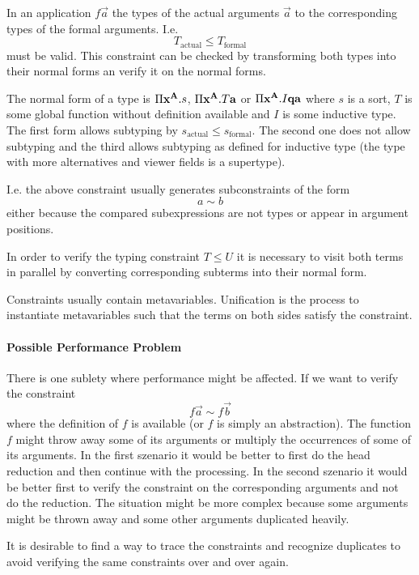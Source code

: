 In an application $f \vec a$ the types of the actual arguments $\vec a$ to the
corresponding types of the formal arguments. I.e.
$$
    T_\text{actual} \le T_\text{formal}
$$
must be valid. This constraint can be checked by transforming both types into
their normal forms an verify it on the normal forms.

The normal form of a type is $\Pi {{\mathbf x}^{{\mathbf A}}}. s$, $\Pi {{\mathbf x}^{{\mathbf A}}}. T {\mathbf a}$ or $\Pi {{\mathbf x}^{{\mathbf A}}} . I {\mathbf q} {\mathbf a}$ where $s$ is a sort, $T$ is some global
function without definition available and $I$ is some inductive type. The first
form allows subtyping by $s_\text{actual} \le s_\text{formal}$. The second one
does not allow subtyping and the third allows subtyping as defined for inductive
type (the type with more alternatives and viewer fields is a supertype).

I.e. the above constraint usually generates subconstraints of the form
$$
    a \sim b
$$
either because the compared subexpressions are not types or appear in argument
positions.

In order to verify the typing constraint $T \le U$ it is necessary to visit both
terms in parallel by converting corresponding subterms into their normal form.

Constraints usually contain metavariables. Unification is the process to
instantiate metavariables such that the terms on both sides satisfy the
constraint.






\paragraph{Possible Performance Problem}
There is one sublety where performance might be affected. If we want to verify
the constraint
$$
    f \vec a \sim f \vec b
$$
where the definition of $f$ is available (or $f$ is simply an abstraction). The
function $f$ might throw away some of its arguments or multiply the occurrences
of some of its arguments. In the first szenario it would be better to first do
the head reduction and then continue with the processing. In the second szenario
it would be better first to verify the constraint on the corresponding arguments
and not do the reduction. The situation might be more complex because some
arguments might be thrown away and some other arguments duplicated heavily.

It is desirable to find a way to trace the constraints and recognize duplicates
to avoid verifying the same constraints over and over again.






